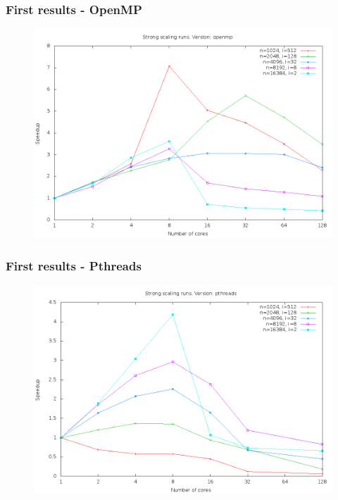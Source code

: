\documentclass{beamer}
\begin{document}
\begin{frame}
\frametitle{First results - OpenMP}
\begin{figure}
\includegraphics[width=\textwidth]{gfx/padding_strong_scaling_openmp_speedup}
\end{figure}
\end{frame}

\begin{frame}
\frametitle{First results - Pthreads}
\begin{figure}
\includegraphics[width=\textwidth]{gfx/padding_strong_scaling_pthreads_speedup}
\end{figure}
\end{frame}
\end{document}
